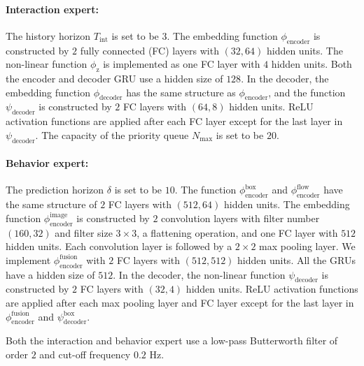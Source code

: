 \paragraph{Interaction expert:} The history horizon $T_\text{int}$ is set to be $3$. The embedding function $\phi_\text{encoder}$ is constructed by $2$ fully connected (FC) layers with $(32, 64)$ hidden units. The non-linear function $\phi_\text{z}$ is implemented as one FC layer with $4$ hidden units. Both the encoder and decoder GRU use a hidden size of $128$. In the decoder, the embedding function $\phi_\text{decoder}$ has the same structure as $\phi_\text{encoder}$, and the function $\psi_\text{decoder}$ is constructed by $2$ FC layers with $(64, 8)$ hidden units. ReLU activation functions are applied after each FC layer except for the last layer in $\psi_\text{decoder}$. The capacity of the priority queue $N_\text{max}$ is set to be $20$.

\paragraph{Behavior expert:} The prediction horizon $\delta$ is set to be $10$. The function $\phi_\text{encoder}^\text{box}$ and $\phi_\text{encoder}^\text{flow}$ have the same structure of $2$ FC layers with $(512, 64)$ hidden units. The embedding function $\phi_\text{encoder}^\text{image}$ is constructed by $2$ convolution layers with filter number $(160, 32)$ and filter size $3 \times 3$, a flattening operation, and one FC layer with $512$ hidden units. Each convolution layer is followed by a $2 \times 2$ max pooling layer. We implement $\phi_\text{encoder}^\text{fusion}$ with $2$ FC layers with $(512, 512)$ hidden units. All the GRUs have a hidden size of $512$. In the decoder, the non-linear function $\psi_\text{decoder}$ is constructed by $2$ FC layers with $(32, 4)$ hidden units. ReLU activation functions are applied after each max pooling layer and FC layer except for the last layer in $\phi_\text{encoder}^\text{fusion}$ and $\psi_\text{decoder}^\text{box}$.

Both the interaction and behavior expert use a low-pass Butterworth filter of order $2$ and cut-off frequency $0.2$ Hz.

\begin{table}[t]
  \begin{center}
    \caption{Determination of training hyperparameters. The learning rate is kept constant during training for each model.}
    \label{table:training-hyperparameters}
  \end{center}
\end{table}

